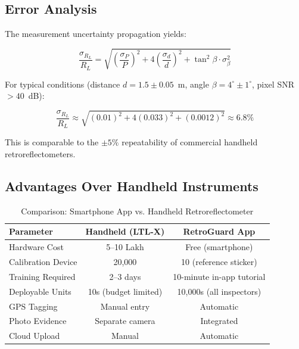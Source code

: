 \documentclass[11pt,a4paper]{article}
\begin{document}
\subsection{Error Analysis}

The measurement uncertainty propagation yields:

\begin{equation}
\frac{\sigma_{R_L}}{R_L} = \sqrt{\left(\frac{\sigma_P}{P}\right)^2 + 4\left(\frac{\sigma_d}{d}\right)^2 + \tan^2\beta \cdot \sigma_\beta^2}
\label{eq:error_propagation}
\end{equation}

For typical conditions (distance $d = 1.5 \pm 0.05$~m, angle $\beta = 4^{\circ} \pm 1^{\circ}$, pixel SNR $> 40$~dB):

\begin{equation}
\frac{\sigma_{R_L}}{R_L} \approx \sqrt{(0.01)^2 + 4(0.033)^2 + (0.0012)^2} \approx 6.8\%
\label{eq:error_estimate}
\end{equation}

This is comparable to the $\pm 5\%$ repeatability of commercial handheld retroreflectometers.

\subsection{Advantages Over Handheld Instruments}

\begin{table}[H]
\centering
\caption{Comparison: Smartphone App vs. Handheld Retroreflectometer}
\label{tab:smartphone_vs_handheld}
\begin{tabular}{@{}lcc@{}}
\toprule
\textbf{Parameter} & \textbf{Handheld (LTL-X)} & \textbf{RetroGuard App} \\
\midrule
Hardware Cost & 5--10 Lakh & Free (smartphone) \\
Calibration Device & 20,000 & 10 (reference sticker) \\
Training Required & 2--3 days & 10-minute in-app tutorial \\
Deployable Units & 10s (budget limited) & 10,000s (all inspectors) \\
GPS Tagging & Manual entry & Automatic \\
Photo Evidence & Separate camera & Integrated \\
Cloud Upload & Manual & Automatic \\
\bottomrule
\end{tabular}
\end{table}
\end{document}

